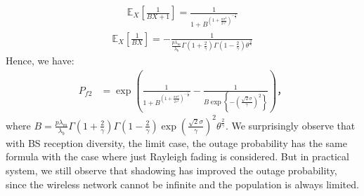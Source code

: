 \begin{align}
	\mathbb{E}_{X} \left[ \frac{1}{BX + 1}\right] = \frac{1}{1 + B^{\left( 1 +\frac{\pi \sigma^2}{2\gamma^2} \right)^{-\frac{1}{2}}}}
\end{align}
\begin{align}
	\mathbb{E}_{X} \left[ \frac{1}{BX}\right] =-\frac{1}{\frac{p\lambda_m}{\lambda_b}\Gamma(1+\frac{2}{\gamma}) \Gamma(1-\frac{2}{\gamma})\theta^{\frac{2}{\gamma}}} 
\end{align}
Hence, we have:
\begin{align}
	\label{eq:analytical_result_approach_1}
	P_{f2} &= \exp(\frac{1}{1 + B^{\left( 1 +\frac{\pi \sigma^2}{2\gamma^2} \right)^{-\frac{1}{2}}}}-\frac{1}{B\exp\left\lbrace  -\left(\frac{\sqrt{2}\sigma}{\gamma}\right) ^2 \right\rbrace } )，
\end{align}
where $B= \frac{p\lambda_m}{\lambda_b}\Gamma(1+\frac{2}{\gamma}) \Gamma(1-\frac{2}{\gamma}) \exp \left( \frac{\sqrt{2}\sigma}{\gamma}\right) ^2 \theta^{\frac{2}{\gamma}}$.
We surprisingly observe that with BS reception diversity, the limit case, the outage probability has the same formula with the case where just Rayleigh fading is considered. But in practical system, we still observe that shadowing has improved the outage probability, since the wireless network cannot be infinite and the population is always limited. 

